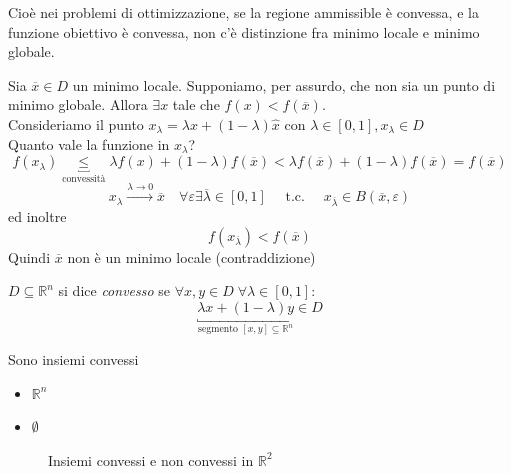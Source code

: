 Cioè nei problemi di ottimizzazione, se la regione ammissible è convessa,
e la funzione obiettivo \`e convessa, non c'\`e distinzione fra minimo locale e 
minimo globale.
\begin{thproof}

 Sia $\overline{x} \in D$ un minimo locale. Supponiamo, per assurdo,
che non sia un punto di minimo globale. Allora $\exists x$ tale 
che $f(x) < f(\overline{x})$. \\
Consideriamo il punto $x_{\lambda} = \lambda x + (1-\lambda)\hat{x}$
con $\lambda \in [0,1],  x_{\lambda} \in D$\\
Quanto vale la funzione in $x_{\lambda}$?
 $$f(x_{\lambda}) \underbracket{\leq}_{\text{convessit\`a}}  \lambda f(x) +
 (1-\lambda)f(\overline{x}) < \lambda f(\overline{x})
 + (1-\lambda) f(\overline{x})
 = f(\overline{x})$$
 $$ x_{\lambda} \xrightarrow{\lambda \rightarrow 0} \overline{x} \quad
  \forall \varepsilon  \exists  \overline{\lambda} \in [0,1] \quad 
 \text{ t.c. }  \quad x_{\overline{\lambda}} \in  B(\overline{x}, \varepsilon)$$
ed inoltre
$$ f(x_{\overline{\lambda}}) < f(\overline{x})$$
Quindi $\overline{x}$ non \`e un minimo locale (contraddizione)
\end{thproof}

\begin{defn}
 $D \subseteq \mathbb{R}^{n}$ si dice \emph{convesso} se 
$\forall x,y \in D \; \forall \lambda \in [0,1]$:
$$ \underbracket{\lambda x + (1-\lambda)y}_{\text{segmento }  [x,y] \subseteq \mathbb{R}^{n}}\in D $$
\end{defn}

\begin{observation}
 Sono insiemi convessi
 \begin{itemize}
 \item $\mathbb{R}^{n}$
 \item $\emptyset$
 \end{itemize}
\end{observation}

\begin{figure}
  \centering
  \caption{Insiemi convessi e non convessi in $\mathbb{R}^2$}
  \label{fig:convexsets}
\end{figure}

